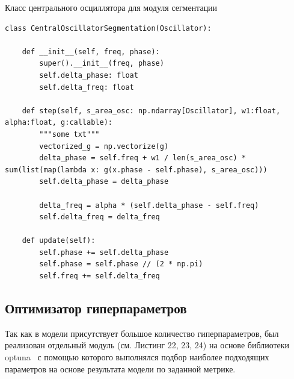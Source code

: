 \documentclass[14pt, russian]{scrartcl}
\begin{document}
\begin{listing}[H]
    \caption{Класс центрального осциллятора для модуля сегментации}
    \label{lst:contour_extr_sobel}
    \begin{verbatim}
class CentralOscillatorSegmentation(Oscillator):

    def __init__(self, freq, phase):
        super().__init__(freq, phase)
        self.delta_phase: float
        self.delta_freq: float

    def step(self, s_area_osc: np.ndarray[Oscillator], w1:float, alpha:float, g:callable):
        """some txt"""
        vectorized_g = np.vectorize(g)
        delta_phase = self.freq + w1 / len(s_area_osc) * sum(list(map(lambda x: g(x.phase - self.phase), s_area_osc)))
        self.delta_phase = delta_phase

        delta_freq = alpha * (self.delta_phase - self.freq)
        self.delta_freq = delta_freq

    def update(self):
        self.phase += self.delta_phase
        self.phase = self.phase // (2 * np.pi)
        self.freq += self.delta_freq
    \end{verbatim}
\end{listing}

\subsection{Оптимизатор гиперпараметров}

Так как в модели присутствует большое количество гиперпараметров, был реализован отдельный модуль (см. Листинг 22, 23, 24) на основе библиотеки optuna~\cite{2} с помощью которого
выполнялся подбор наиболее подходящих параметров на основе результата модели по заданной метрике.
\end{document}
